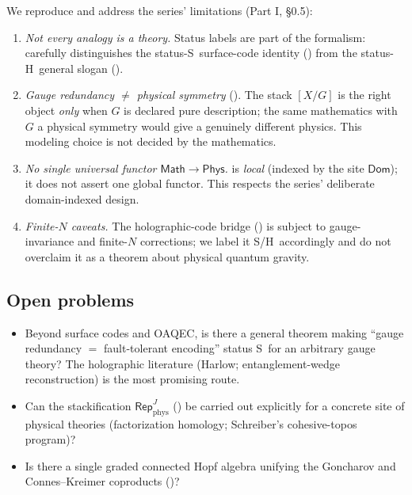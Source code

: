 \documentclass[12pt]{article}
\theoremstyle{definition}
\theoremstyle{remark}
\newcommand{\Dom}{\mathsf{Dom}}
\newcommand{\Math}{\mathsf{Math}}
\newcommand{\Phys}{\mathsf{Phys}}
\newcommand{\Repp}{\mathsf{Rep}_{\mathrm{phys}}}
\newcommand{\quot}[2]{[#1/#2]}
\newcommand{\Ss}{\textsf{S}}
\newcommand{\Hh}{\textsf{H}}
\begin{document}
We reproduce and address the series' limitations (Part I, \S0.5):
\begin{enumerate}
\item \emph{Not every analogy is a theory.} Status labels are part of the formalism:
 carefully distinguishes the status-\Ss\ surface-code identity
() from the status-\Hh\ general slogan ().
\item \emph{Gauge redundancy $\neq$ physical symmetry} (). The
stack $\quot{X}{G}$ is the right object \emph{only} when $G$ is declared pure
description; the same mathematics with $G$ a physical symmetry would give a genuinely
different physics. This modeling choice is not decided by the mathematics.
\item \emph{No single universal functor $\Math\to\Phys$.}  is
\emph{local} (indexed by the site $\Dom$); it does not assert one global functor. This
respects the series' deliberate domain-indexed design.
\item \emph{Finite-$N$ caveats.} The holographic-code bridge () is
subject to gauge-invariance and finite-$N$ corrections; we label it \Ss/\Hh\ accordingly
and do not overclaim it as a theorem about physical quantum gravity.
\end{enumerate}

\subsection{Open problems}

\begin{itemize}
\item Beyond surface codes and OAQEC, is there a general theorem making ``gauge
redundancy $=$ fault-tolerant encoding'' status \Ss\ for an arbitrary gauge theory?
The holographic literature (Harlow; entanglement-wedge reconstruction) is the most
promising route.
\item Can the stackification $\Repp^{J}$ () be carried out
explicitly for a concrete site of physical theories (factorization homology; Schreiber's
cohesive-topos program)?
\item Is there a single graded connected Hopf algebra unifying the Goncharov and
Connes--Kreimer coproducts ()?
\end{itemize}

\end{document}
